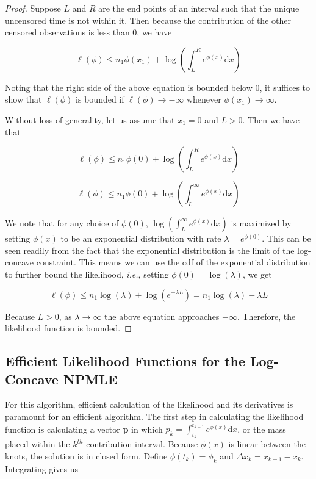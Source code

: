 \begin{proof}
	Suppose $L$ and $R$ are the end points of an interval such that the unique uncensored time is not within it. Then because the contribution of the other censored observations is less than 0, we have
	
	\[
	\ell(\phi) \leq n_1 \phi(x_1) + \log \left( \displaystyle \int_L^R e^{\phi(x)} \mathrm{d}x \right)
	\]
	
	Noting that the right side of the above equation is bounded below 0, it suffices to show that $\ell(\phi)$ is bounded if $\ell(\phi) \rightarrow -\infty$ whenever $\phi(x_1) \rightarrow \infty$. 
	
	Without loss of generality, let us assume that $x_1 = 0$ and $L > 0$. Then we have that 
	
	\[
	 \ell(\phi) \leq n_1 \phi(0) + \log \left( \displaystyle \int_L^R e^{\phi(x)} \mathrm{d}x \right) 
	\]
	
	\[
	\ell(\phi) \leq n_1 \phi(0) + \log \left( \displaystyle \int_L^\infty e^{\phi(x)} \mathrm{d}x \right)
	\]

	We note that for any choice of $\phi(0)$, $\log \left( \displaystyle \int_L^\infty e^{\phi(x)} \mathrm{d}x \right) $ is maximized by setting $\phi(x)$ to be an exponential distribution with rate $\lambda = e^{\phi(0)}$. This can be seen readily from the fact that the exponential distribution is the limit of the log-concave constraint. This means we can use the cdf of the exponential distribution to further bound the likelihood, \emph{i.e.}, setting $\phi(0) = \log(\lambda)$, we get 
	
	\[
	\ell(\phi) \leq n_1 \log(\lambda) + \log( e^{- \lambda L} ) = n_1 \log(\lambda) - \lambda L
	\]
	
	Because $L > 0$, as $\lambda \rightarrow \infty$ the above equation approaches $-\infty$. Therefore, the likelihood function is bounded. 
	
	\end{proof}

	\subsection{Efficient Likelihood Functions for the Log-Concave NPMLE}
		
	For this algorithm, efficient calculation of the likelihood and its derivatives is paramount for an efficient algorithm. The first step in calculating the likelihood function is calculating a vector {\bf p} in which $p_k = \int_{t_k}^{t_{k+1}} e^ { \phi(x) } \mathrm{d}x$, or the mass placed within the $k^{th}$ contribution interval. Because $\phi(x)$ is linear between the knots, the solution is in closed form. Define $\phi(t_k) = \phi_k$ and $\Delta x_k = x_{k+1} - x_k$. Integrating gives us 
	
